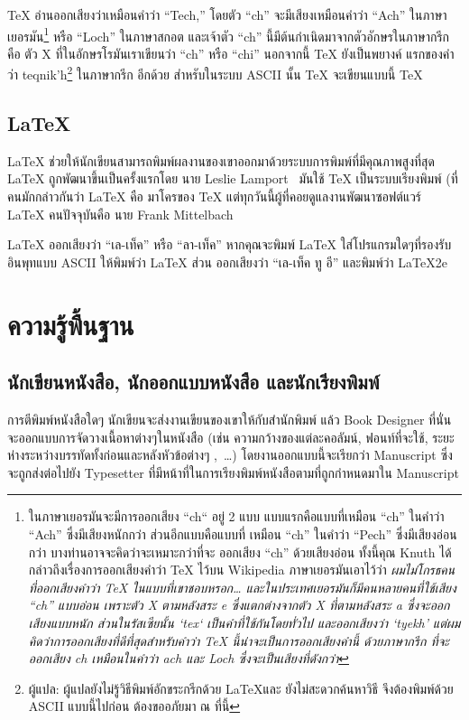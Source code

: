 \TeX{} อ่านออกเสียงว่าเหมือนคำว่า ``Tech,'' โดยตัว ``ch'' จะมีเสียงเหมือนคำว่า
``Ach'' ในภาษาเยอรมัน\footnote{ในภาษาเยอรมันจะมีการออกเสียง ``ch`` อยู่ 2 แบบ
แบบแรกคือแบบที่เหมือน ``ch'' ในคำว่า ``Ach'' ซึ่งมีเสียงหนักกว่า ส่วนอีกแบบคือแบบที่%
เหมือน ``ch'' ในคำว่า ``Pech'' ซึ่งมีเสียงอ่อนกว่า บางท่านอาจจะคิดว่าจะเหมาะกว่าที่จะ%
ออกเสียง ``ch'' ด้วยเสียงอ่อน ทั้งนี้คุณ Knuth ได้กล่าวถึงเรื่องการออกเสียงคำว่า \TeX{}
ไว้บน Wikipedia ภาษาเยอรมันเอาไว้ว่า \emph{ผมไม่โกรธคนที่ออกเสียงคำว่า \TeX{}
ในแบบที่เขาชอบหรอก\ldots{} และในประเทศเยอรมันก็มีคนหลายคนที่ใช้เสียง ``ch''
แบบอ่อน เพราะตัว X ตามหลังสระ e ซึ่งแตกต่างจากตัว X ที่ตามหลังสระ a
ซึ่งจะออกเสียงแบบหนัก ส่วนในรัสเซียนั้น `tex` เป็นคำที่ใช้กันโดยทั่วไป และออกเสียงว่า
`tyekh' แต่ผมคิดว่าการออกเสียงที่ดีที่สุดสำหรับคำว่า \TeX{} นี้น่าจะเป็นการออกเสียงคำนี้%
ด้วยภาษากรีก ที่จะออกเสียง ch เหมือนในคำว่า ach และ Loch ซึ่งจะเป็นเสียงที่ดังกว่า}}
หรือ ``Loch'' ในภาษาสกอต และเจ้าตัว ``ch'' นี้มีต้นกำเนิดมาจากตัวอักษรในภาษากรีก คือ
ตัว X ที่ในอักษรโรมันเราเขียนว่า ``ch'' หรือ ``chi'' นอกจากนี้ \TeX{} ยังเป็นพยางค์%
แรกของคำว่า teqnik'h\footnote{ผู้แปล: ผู้แปลยังไม่รู้วิธีพิมพ์อักขระกรีกด้วย \LaTeX และ
ยังไม่สะดวกค้นหาวิธี จึงต้องพิมพ์ด้วย ASCII แบบนี้ไปก่อน ต้องขออภัยมา ณ ที่นี้} ในภาษากรีก%
อีกด้วย สำหรับในระบบ ASCII นั้น \TeX{} จะเขียนแบบนี้ TeX

\subsection{\LaTeX}

\LaTeX{} ช่วยให้นักเขียนสามารถพิมพ์ผลงานของเขาออกมาด้วยระบบการพิมพ์ที่มีคุณภาพสูงที่สุด
\LaTeX{} ถูกพัฒนาขึ้นเป็นครั้งแรกโดย นาย Leslie
Lamport~\cite{manual}  มันใช้ \TeX{} เป็นระบบเรียงพิมพ์ (ที่คนมักกล่าวกันว่า
\LaTeX{} คือ มาโครของ \TeX{} แต่ทุกวันนี้ผู้ที่คอยดูแลงานพัฒนาซอฟต์แวร์ \LaTeX{}
คนปัจจุบันคือ นาย Frank Mittelbach

\LaTeX{} ออกเสียงว่า ``เล-เท็ค'' หรือ ``ลา-เท็ค'' หากคุณจะพิมพ์ \LaTeX{}
ใส่โปรแกรมใดๆที่รองรับอินพุทแบบ ASCII ให้พิมพ์ว่า LaTeX ส่วน \LaTeXe{}
ออกเสียงว่า ``เล-เท็ค ทู อี'' และพิมพ์ว่า LaTeX2e

\section{ความรู้พื้นฐาน}

\subsection{นักเขียนหนังสือ, นักออกแบบหนังสือ และนักเรียงพิมพ์}

การตีพิมพ์หนังสือใดๆ นักเขียนจะส่งงานเขียนของเขาให้กับสำนักพิมพ์%
แล้ว Book Designer ที่นั่นจะออกแบบการจัดวางเนื้อหาต่างๆในหนังสือ (เช่น
ความกว้างของแต่ละคอลัมน์, ฟอนท์ที่จะใช้, ระยะห่างระหว่างบรรทัดทั้งก่อนและหลังหัวข้อต่างๆ%
,~\dots) โดยงานออกแบบนี้จะเรียกว่า Manuscript ซึ่งจะถูกส่งต่อไปยัง Typesetter
ที่มีหน้าที่ในการเรียงพิมพ์หนังสือตามที่ถูกกำหนดมาใน Manuscript

\shbtoaddmoretranslation
